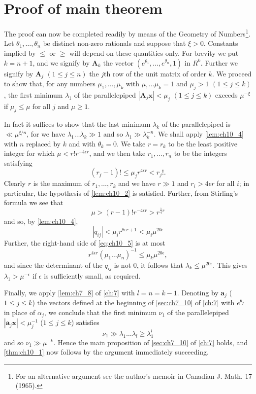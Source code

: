 \section{Proof of main theorem}\label{sec:ch10_3}

The proof can now be completed readily by means of the Geometry of Numbers\footnote{For an alternative argument see the author's memoir in Canadian J. Math. 17
(1965).}. Let $\theta_1, \ldots, \theta_n$ be distinct non-zero rationals and suppose that $\xi > 0$. Constants implied by $\leqslant$ or $\geqslant$ will depend on these quantities only. For brevity we put $k = n + 1$, and we signify by $\mathbf{A}_k$ the vector $(e^{\theta_1}, \ldots, e^{\theta_n}, 1)$ in $R^k$. Further we signify by $\mathbf{A}_j$ $(1 \leqslant j \leqslant n)$ the $j$th row of the unit matrix of order $k$. We proceed to show that, for any numbers $\mu_1, \ldots, \mu_k$ with $\mu_1 \ldots \mu_k = 1$ and $\mu_j > 1$ $(1 \leqslant j \leqslant k)$, the first minimum $\lambda_1$ of the parallelepiped $|\mathbf{A}_j \mathbf{x}| < \mu_j$ $(1 \leqslant j \leqslant k)$ exceeds $\mu^{-\xi}$ if $\mu_j \leqslant \mu$ for all $j$ and $\mu \geqslant 1$.

In fact it suffices to show that the last minimum $\lambda_k$ of the parallelepiped is $\ll \mu^{\xi/n}$, for we have $\lambda_1 \dots \lambda_k \gg 1$ and so $\lambda_1 \gg \lambda_k^{-n}$. We shall apply \autoref{lem:ch10_4} with $n$ replaced by $k$ and with $\theta_k = 0$. We take $r = r_k$ to be the least positive integer for which $\mu < r! r^{-4\epsilon r}$, and we then take $r_1, \dots, r_n$ to be the integers satisfying
\[(r_j-1)!\leqslant \mu_j r^{4\epsilon r}< r_j!.\]
Clearly $r$ is the maximum of $r_1, \ldots, r_k$ and we have $r \gg 1$ and $r_i > 4\epsilon r$ for all $i$; in particular, the hypothesis of \autoref{lem:ch10_2} is satisfied. Further, from Stirling's formula we see that
\[\mu > (r-1)! r^{-4\epsilon r} > r^{\frac{1}{4}r}\]
and so, by \autoref{lem:ch10_4},
\[|q_{ij}| < \mu_i r^{8\epsilon r + 1} < \mu_i \mu^{20\epsilon}\]
Further, the right-hand side of \eqref{eq:ch10_5} is at most
\[r^{4\epsilon r}(\mu_1\dots\mu_n)^{-1}\leqslant \mu_k\mu^{20\epsilon},\]
and since the determinant of the $q_{ij}$ is not 0, it follows that $\lambda_k \leq \mu^{20\epsilon}$. This gives $\lambda_1 > \mu^{-\epsilon}$ if $\epsilon$ is sufficiently small, as required.

Finally, we apply \autoref{lem:ch7_8} of \autoref{ch:7} with $l = n = k - 1$. Denoting by $\mathbf{a}_j$ ($1 \le j \le k$) the vectors defined at the beginning of \autoref{sec:ch7_10} of \autoref{ch:7} with $e^{\theta_j}$ in place of $\alpha_j$, we conclude that the first minimum $\nu_1$ of the parallelepiped $|\mathbf{a}_j \mathbf{x}| < \mu_j^{-1}$ ($1 \le j \le k$) satisfies
\[\nu_1 \gg \lambda_1 \dots \lambda_l \geqslant \lambda_1^l\]
and so $\nu_1 \gg \mu^{-k}$. Hence the main proposition of \autoref{sec:ch7_10} of \autoref{ch:7} holds, and \autoref{thm:ch10_1} now follows by the argument immediately succeeding.